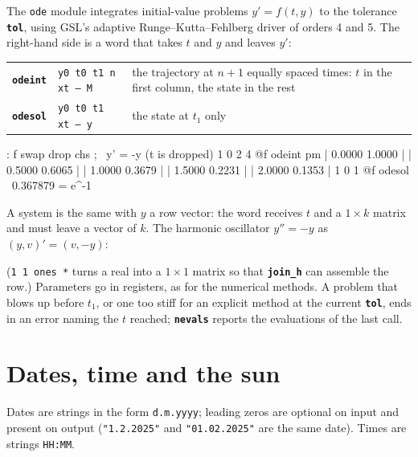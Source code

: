 \documentclass[11pt,letterpaper]{article}
\newcommand{\code}[1]{\texttt{#1}}
\newcommand{\cmd}[1]{\texttt{\textbf{#1}}}
\newcommand{\stk}[1]{\texttt{#1}}
\begin{document}
The \code{ode} module integrates initial-value problems $y' = f(t, y)$ to the tolerance \cmd{tol}, using GSL's adaptive Runge--Kutta--Fehlberg driver of orders 4 and 5.  The right-hand side is a word that takes $t$ and $y$ and leaves $y'$:
\begin{center}
\begin{tabular}{@{}llp{}@{}}
\toprule
\cmd{odeint} & \stk{y0 t0 t1 n xt -- M} & the trajectory at $n+1$ equally spaced times: $t$ in the first column, the state in the rest \\
\cmd{odesol} & \stk{y0 t0 t1 xt -- y} & the state at $t_1$ only \\
\bottomrule
\end{tabular}
\end{center}
\begin{rpn}
: f swap drop chs ;          \ y' = -y   (t is dropped)
1 0 2 4 @f odeint pm
| 0.0000 1.0000 |
| 0.5000 0.6065 |
| 1.0000 0.3679 |
| 1.5000 0.2231 |
| 2.0000 0.1353 |
1 0 1 @f odesol              \ 0.367879 = e^-1
\end{rpn}
A system is the same with $y$ a row vector: the word receives $t$ and a $1\times k$ matrix and must leave a vector of $k$. The harmonic oscillator $y'' = -y$ as $(y, v)' = (v, -y)$:
(\code{1 1 ones *} turns a real into a $1$ matrix so that \cmd{join\_h} can assemble the row.) Parameters go in registers, as for the numerical methods. A problem that blows up before $t_1$, or one too stiff for an explicit method at the current \cmd{tol}, ends in an error naming the $t$ reached; \cmd{nevals} reports the evaluations of the last call.

\section{Dates, time and the sun}

Dates are strings in the form \code{d.m.yyyy}; leading zeros are optional on input and present on output (\code{"1.2.2025"} and \code{"01.02.2025"} are the same date). Times are strings \code{HH:MM}.
\end{document}

